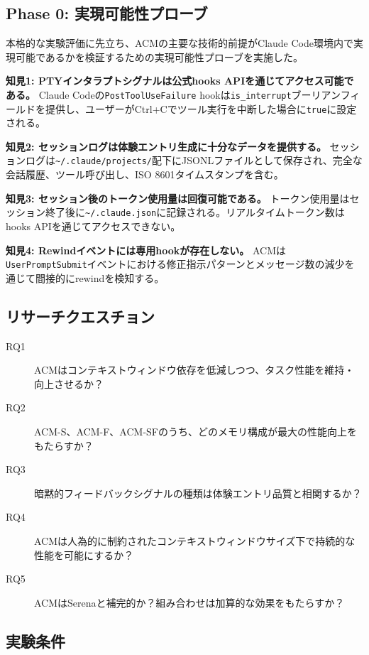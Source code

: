 \documentclass[conference]{IEEEtran}
\begin{document}
\subsection{Phase 0: 実現可能性プローブ}

本格的な実験評価に先立ち、ACMの主要な技術的前提がClaude Code環境内で実現可能であるかを検証するための実現可能性プローブを実施した。

\textbf{知見1: PTYインタラプトシグナルは公式hooks APIを通じてアクセス可能である。}
Claude Codeの\texttt{PostToolUseFailure} hookは\texttt{is\_interrupt}ブーリアンフィールドを提供し、ユーザーがCtrl+Cでツール実行を中断した場合に\texttt{true}に設定される。

\textbf{知見2: セッションログは体験エントリ生成に十分なデータを提供する。}
セッションログは\texttt{\textasciitilde/.claude/projects/}配下にJSONLファイルとして保存され、完全な会話履歴、ツール呼び出し、ISO 8601タイムスタンプを含む。

\textbf{知見3: セッション後のトークン使用量は回復可能である。}
トークン使用量はセッション終了後に\texttt{\textasciitilde/.claude.json}に記録される。リアルタイムトークン数はhooks APIを通じてアクセスできない。

\textbf{知見4: Rewindイベントには専用hookが存在しない。}
ACMは\texttt{UserPromptSubmit}イベントにおける修正指示パターンとメッセージ数の減少を通じて間接的にrewindを検知する。

\subsection{リサーチクエスチョン}

\begin{description}
\item[RQ1] ACMはコンテキストウィンドウ依存を低減しつつ、タスク性能を維持・向上させるか？
\item[RQ2] ACM-S、ACM-F、ACM-SFのうち、どのメモリ構成が最大の性能向上をもたらすか？
\item[RQ3] 暗黙的フィードバックシグナルの種類は体験エントリ品質と相関するか？
\item[RQ4] ACMは人為的に制約されたコンテキストウィンドウサイズ下で持続的な性能を可能にするか？
\item[RQ5] ACMはSerenaと補完的か？組み合わせは加算的な効果をもたらすか？
\end{description}

\subsection{実験条件}
\end{document}
